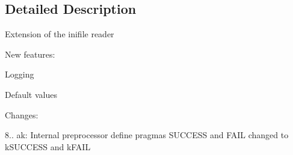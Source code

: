 \subsection{Detailed Description}
Extension of the inifile reader

New features\-: \begin{DoxyItemize}
\item Logging \item Default values\end{DoxyItemize}
Changes\-:
\begin{DoxyItemize}
\item 8.. ak\-: Internal preprocessor define pragmas S\-U\-C\-C\-E\-S\-S and F\-A\-I\-L changed to k\-S\-U\-C\-C\-E\-S\-S and k\-F\-A\-I\-L 
\end{DoxyItemize}

